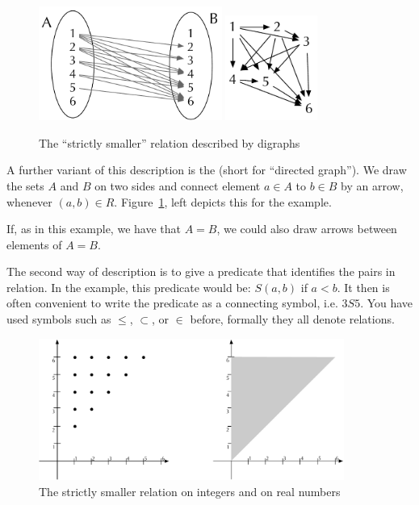 \begin{figure}[t]
\begin{center}
\includegraphics[width=6cm]{pic/RelDigraph.pdf}
\qquad
\includegraphics[width=3cm]{pic/RelOneDigraph.pdf}
\end{center}
\caption{The ``strictly smaller'' relation described by digraphs}
\label{figRelDigraph}
\end{figure}

A further variant of this description is the  (short for
``directed graph''). We draw the sets $A$ and $B$ on two sides and connect
element $a\in A$ to $b\in B$ by an arrow, whenever $(a,b)\in R$.
Figure~\ref{figRelDigraph}, left depicts this for the example.
\smallskip

If, as in this example, we have that $A=B$, we could also draw arrows between elements
of $A=B$.

\medskip

The second way of description is to give a predicate that 
identifies the pairs in relation. In the example, this predicate would be:
$S(a,b)$ if
$a<b$. It then is often convenient to write the predicate as a connecting
symbol, i.e. $3S5$. You have used symbols such as $\le$,
$\subset$, or $\in$ before, formally they all denote relations.
\medskip

\begin{figure}[t]
\begin{center}
\includegraphics[width=10cm]{pic/StrictlySmallerRel.pdf}
\end{center}
\caption{The strictly smaller relation on integers and on real numbers}
\label{figsmaller}
\end{figure}

